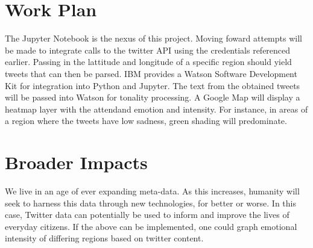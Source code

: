 \documentclass[12pt, oneside]{article}
\begin{document}
\section{Work Plan}
The Jupyter Notebook is the nexus of this project. Moving foward attempts will
be made to integrate calls to the twitter API using the credentials referenced
earlier. Passing in the lattitude and longitude of a specific region should
yield tweets that can then be parsed. IBM provides a Watson Software
Development Kit for integration into Python and Jupyter. The text from the
obtained tweets will be passed into Watson for tonality processing. A Google
Map will display a heatmap layer with the attendand emotion and intensity. For
instance, in areas of a region where the tweets have low sadness, green shading
will predominate.

\section{Broader Impacts}
We live in an age of ever expanding meta-data. As this increases, humanity will
seek to harness this data through new technologies, for better or worse. In
this case, Twitter data can potentially be used to inform and improve the lives
of everyday citizens. If the above can be implemented, one could graph
emotional intensity of differing regions based on twitter content.

\newpage{}


%

\end{document}
